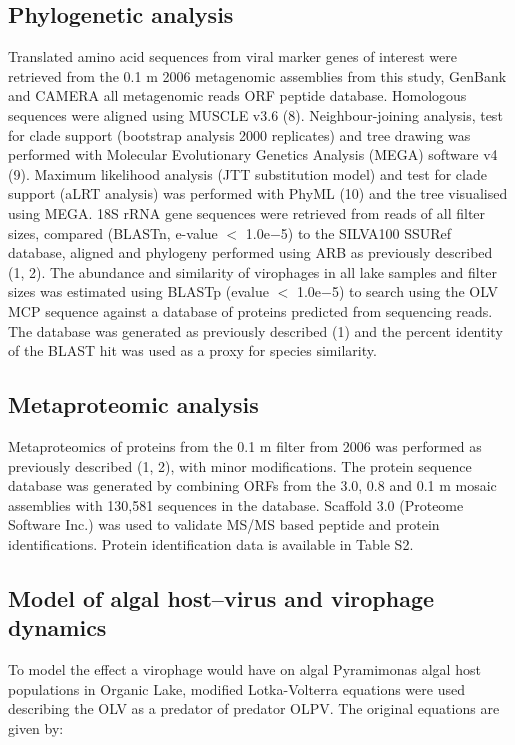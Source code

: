 \subsection{Phylogenetic analysis}
Translated amino acid sequences from viral marker genes of interest were retrieved from the 0.1 \textmu{}m 2006 metagenomic assemblies from this study, GenBank and CAMERA all metagenomic reads ORF peptide database. Homologous sequences were aligned using MUSCLE v3.6 (8). 
Neighbour-joining analysis, test for clade support (bootstrap analysis 2000 replicates) and tree drawing was performed with Molecular Evolutionary Genetics Analysis (MEGA) software v4 (9). 
Maximum likelihood analysis (JTT substitution model) and test for clade support (aLRT analysis) was performed with PhyML (10) and the tree visualised using MEGA. 
18S rRNA gene sequences were retrieved from reads of all filter sizes, compared (BLASTn, e-value $<$ 1.0e$-$5) to the SILVA100 SSURef database, aligned and phylogeny performed using ARB as previously described (1, 2). 
The abundance and similarity of virophages in all lake samples and filter sizes was estimated using BLASTp (evalue $<$ 1.0e$-$5) to search using the OLV MCP sequence against a database of proteins predicted from sequencing reads. 
The database was generated as previously described (1) and the percent identity of the BLAST hit was used as a proxy for species similarity. 

\subsection{Metaproteomic analysis}
Metaproteomics of proteins from the 0.1 \textmu{}m filter from 2006 was performed as previously described (1, 2), with minor modifications. 
The protein sequence database was generated by combining ORFs from the 3.0, 0.8 and 0.1 \textmu{}m mosaic assemblies with 130,581 sequences in the database. 
Scaffold 3.0 (Proteome Software Inc.) was used to validate MS/MS based peptide and protein identifications. 
Protein identification data is available in Table S2. 

\subsection[Algal Host--Virus and Virophage Dynamics]{Model of algal host--virus and virophage dynamics}
To model the effect a virophage would have on algal Pyramimonas algal host populations in Organic Lake, modified Lotka-Volterra equations were used describing the OLV as a predator of predator OLPV. 
The original equations are given by:

